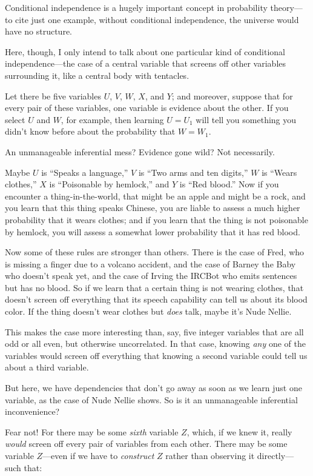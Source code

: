 {{{
 Conditional independence is a hugely important concept in
probability theory---to cite just one example, without conditional
independence, the universe would have no structure.}

{
 Here, though, I only intend to talk about one particular kind of
conditional independence---the case of a central variable that screens
off other variables surrounding it, like a central body with
tentacles.}

{
 Let there be five variables $U$, $V$, $W$, $X$, and $Y$; and moreover,
suppose that for every pair of these variables, one variable is
evidence about the other. If you select $U$ and $W$, for example, then
learning $U = U_{1}$ will tell you something you
didn't know before about the probability that $W =
W_{1}$.}

{
 An unmanageable inferential mess? Evidence gone wild? Not
necessarily.}

{
 Maybe $U$ is ``Speaks a
language,'' $V$ is ``Two arms and ten
digits,'' $W$ is ``Wears
clothes,'' $X$ is ``Poisonable by
hemlock,'' and $Y$ is ``Red
blood.'' Now if you encounter a thing-in-the-world,
that might be an apple and might be a rock, and you learn that this
thing speaks Chinese, you are liable to assess a much higher
probability that it wears clothes; and if you learn that the thing is
not poisonable by hemlock, you will assess a somewhat lower probability
that it has red blood.}

{
 Now some of these rules are stronger than others. There is the
case of Fred, who is missing a finger due to a volcano accident, and
the case of Barney the Baby who doesn't speak yet, and
the case of Irving the IRCBot who emits sentences but has no blood. So
if we learn that a certain thing is not wearing clothes, that
doesn't screen off everything that its speech
capability can tell us about its blood color. If the thing
doesn't wear clothes but \textit{does} talk, maybe
it's Nude Nellie.}

{
 This makes the case more interesting than, say, five integer
variables that are all odd or all even, but otherwise uncorrelated. In
that case, knowing \textit{any} one of the variables would screen off
everything that knowing a second variable could tell us about a third
variable.}

{
 But here, we have dependencies that don't go away
as soon as we learn just one variable, as the case of Nude Nellie
shows. So is it an unmanageable inferential inconvenience?}

{
 Fear not! For there may be some \textit{sixth} variable $Z$, which,
if we knew it, really \textit{would} screen off every pair of variables
from each other. There may be some variable $Z$---even if we have to
\textit{construct} $Z$ rather than observing it directly---such that:}

}}

